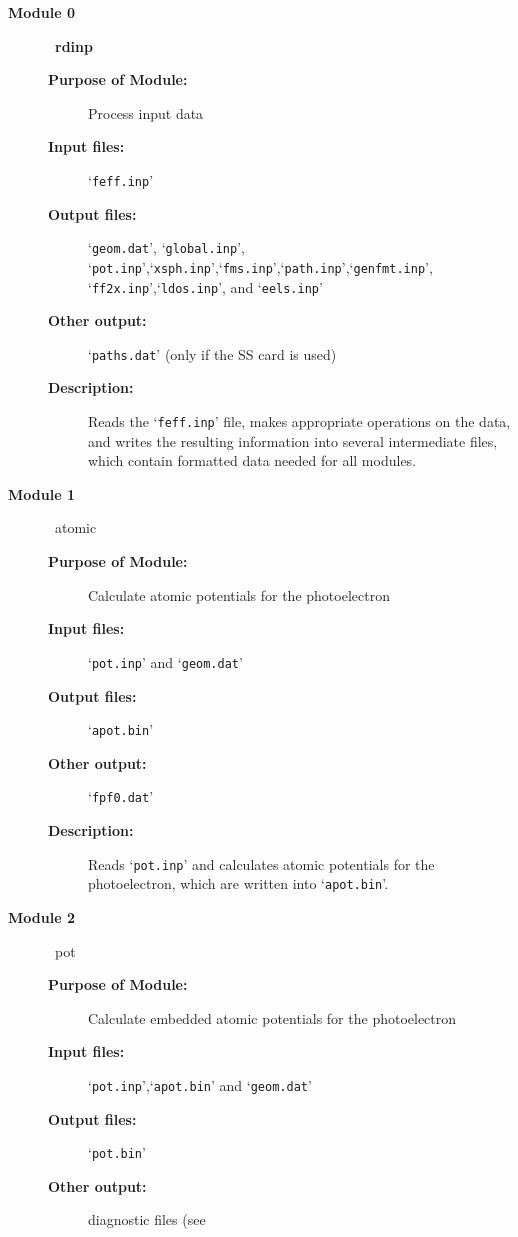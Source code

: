 \documentclass[11pt,oneside]{report} %
\newcommand{\file}[1]{`\texttt{#1}'}
\newcommand{\module}[1]{\textrm{\bf{#1}}}
\begin{document}
\begin{latexonly}
\begin{description}
\item[\large\textbf{Module 0}]\dotfill\  {\large\module{rdinp}}
  \begin{description}
  \item[\textbf{Purpose of Module:}] Process input data
  \item[\textbf{Input files:}] \file{feff.inp}
  \item[\textbf{Output files:}] \file{geom.dat}, \file{global.inp},
       \file{pot.inp},\file{xsph.inp},\file{fms.inp},\file{path.inp},\file{genfmt.inp},
       \file{ff2x.inp},\file{ldos.inp}, and \file{eels.inp}
  \item[\textbf{Other output:}] \file{paths.dat} (only if the SS card is used)
  \item[\textbf{Description:}] Reads the \file{feff.inp} file, makes
    appropriate operations on the data, and writes the resulting
    information into several intermediate files, which
    contain formatted data needed for all modules.
  \end{description}
\item [\large\textbf{Module 1}]\dotfill\  {\large\textrm{atomic}}
  \begin{description}
  \item[\textbf{Purpose of Module:}] Calculate atomic
    potentials for the photoelectron
  \item[\textbf{Input files:}] \file{pot.inp} and \file{geom.dat}
  \item[\textbf{Output files:}] \file{apot.bin}
  \item[\textbf{Other output:}] \file{fpf0.dat}
  \item[\textbf{Description:}] Reads \file{pot.inp} and calculates atomic potentials
    for the photoelectron, which are written into \file{apot.bin}.
  \end{description}
\item [\large\textbf{Module 2}]\dotfill\  {\large\textrm{pot}}
  \begin{description}
  \item[\textbf{Purpose of Module:}] Calculate embedded atomic
    potentials for the photoelectron
  \item[\textbf{Input files:}] \file{pot.inp},\file{apot.bin} and \file{geom.dat}
  \item[\textbf{Output files:}] \file{pot.bin}
  \item[\textbf{Other output:}] diagnostic files (see

\end{description}
\end{description}
\end{latexonly}
\end{document}
